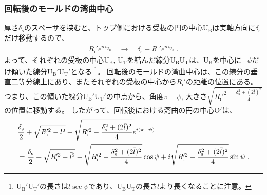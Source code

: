 \subsubsection{回転後のモールドの湾曲中心}
厚さ$\delta_\mathrm s$のスペーサを挟むと、トップ側における受板の円の中心U$_\mathrm B$は実軸方向に$\delta_\mathrm s$だけ移動するので、
\begin{align*}
  R_\mathrm i'e^{i\alpha_{\mathrm U_\mathrm B}}
  \quad\longrightarrow\quad
  \delta_\mathrm s+R_\mathrm i'e^{i\alpha_{\mathrm U_\mathrm B}}\ .
\end{align*}
よって、それぞれの受板の中心U$_\mathrm B$, U$_\mathrm T$を結んだ線分U$_\mathrm B$U$_\mathrm T$は、U$_\mathrm B$を中心に$-\psi$だけ傾いた線分U$_\mathrm B'$U$_\mathrm T'$となる
\footnote{%
U$_\mathrm B'$U$_\mathrm T'$の長さは$\bar l\sec\psi$であり、U$_\mathrm B$U$_\mathrm T$の長さ$\bar l$より長くなることに注意。}。
回転後のモールドの湾曲中心は、この線分の垂直二等分線上にあり、またそれぞれの受板の中心から$R_\mathrm i'$の距離の位置にある。
つまり、この傾いた線分U$_\mathrm B'$U$_\mathrm T'$の中点から、角度$\pi-\psi$, 大きさ$\sqrt{R_\mathrm i'^2-\frac{\delta_\mathrm s^2+(2\bar l)^2}4}$の位置に移動する。
したがって、回転後における湾曲の円の中心O$'$は、
\begin{align}
  \notag
  & \frac{\delta_\mathrm s}2+\sqrt{R_\mathrm i'^2-\bar l^2}
    +\sqrt{R_\mathrm i'^2-\frac{\delta_\mathrm s^2+(2\bar l)^2}4}e^{i(\pi-\psi)}\\
  & = \frac{\delta_\mathrm s}2+\sqrt{R_\mathrm i'^2-\bar l^2}-\sqrt{R_\mathrm i'^2-\frac{\delta_\mathrm s^2+(2\bar l)^2}4}\cos\psi
      +i\sqrt{R_\mathrm i'^2-\frac{\delta_\mathrm s^2+(2\bar l)^2}4}\sin\psi\ .
    \label{eq:afterOrgin}
\end{align}


